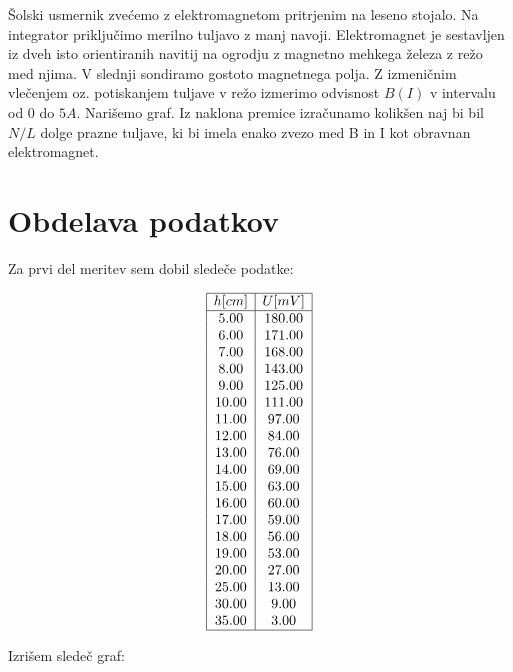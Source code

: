 \documentclass[12pt]{report}
\begin{document}
Šolski usmernik zvećemo z elektromagnetom pritrjenim na leseno stojalo. Na integrator priključimo merilno tuljavo z manj navoji. Elektromagnet je sestavljen iz dveh isto orientiranih navitij na ogrodju z magnetno mehkega železa z režo med njima. V slednji sondiramo gostoto magnetnega polja. Z izmeničnim vlečenjem oz. potiskanjem tuljave v režo izmerimo odvisnost $B(I)$ v intervalu od $0$ do $5A$. Narišemo graf. Iz naklona premice izračunamo kolikšen naj bi bil $N/L$ dolge prazne tuljave, ki bi imela enako zvezo med B in I kot obravnan elektromagnet. 
\endgroup


\chapter*{Obdelava podatkov}

Za prvi del meritev sem dobil sledeče podatke: 


\begin{tabela}[H]
  \centering
  \[
  \begin{array}{|c|c|}\hline
    h [cm] & U [mV] \\ \hline
    5.00 &  180.00\\ 
    6.00 &  171.00\\
    7.00 &  168.00\\
    8.00 &  143.00\\
    9.00 &  125.00\\
   10.00 &  111.00\\
   11.00 &   97.00\\
   12.00 &   84.00\\
   13.00 &   76.00\\
   14.00 &   69.00\\
   15.00 &   63.00\\
   16.00 &   60.00\\
   17.00 &   59.00\\
   18.00 &   56.00\\
   19.00 &   53.00\\
   20.00 &   27.00\\
   25.00 &   13.00\\
   30.00 &    9.00\\
   35.00 &    3.00 \\ \hline
  \end{array}
  \]
\end{tabela}


Izrišem sledeč graf: 
\end{document}
